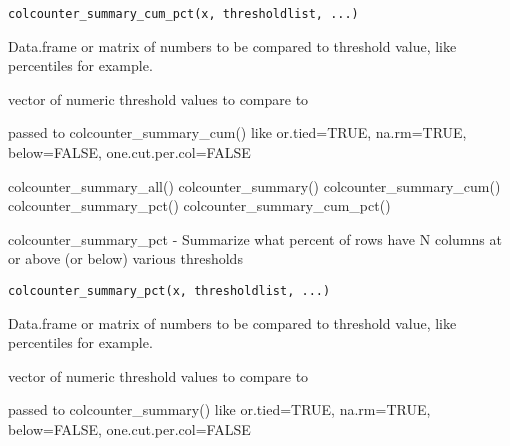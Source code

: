 \documentclass[a4paper]{book}
\begin{document}
%
\begin{Usage}
\begin{verbatim}
colcounter_summary_cum_pct(x, thresholdlist, ...)
\end{verbatim}
\end{Usage}
%
\begin{Arguments}
\begin{ldescription}
\item[\code{x}] Data.frame or matrix of numbers to be compared to threshold value,
like percentiles for example.

\item[\code{thresholdlist}] vector of numeric threshold values to compare to

\item[\code{...}] passed to colcounter\_summary\_cum()
like or.tied=TRUE, na.rm=TRUE, below=FALSE, one.cut.per.col=FALSE
\end{ldescription}
\end{Arguments}
%
\begin{SeeAlso}\relax
colcounter\_summary\_all() colcounter\_summary() colcounter\_summary\_cum() colcounter\_summary\_pct() colcounter\_summary\_cum\_pct()
\end{SeeAlso}
%
\begin{Description}\relax
colcounter\_summary\_pct - Summarize what percent of rows have N columns at or above (or below) various thresholds
\end{Description}
%
\begin{Usage}
\begin{verbatim}
colcounter_summary_pct(x, thresholdlist, ...)
\end{verbatim}
\end{Usage}
%
\begin{Arguments}
\begin{ldescription}
\item[\code{x}] Data.frame or matrix of numbers to be compared to threshold value,
like percentiles for example.

\item[\code{thresholdlist}] vector of numeric threshold values to compare to

\item[\code{...}] passed to colcounter\_summary()
like or.tied=TRUE, na.rm=TRUE, below=FALSE, one.cut.per.col=FALSE
\end{ldescription}
\end{Arguments}
\end{document}
